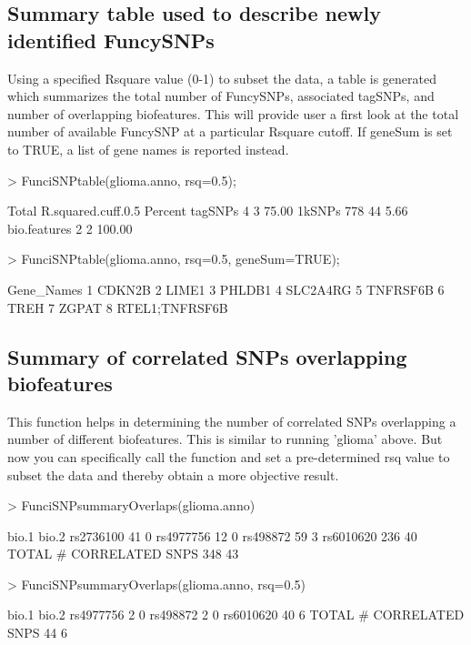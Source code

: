 \documentclass[a4paper]{article}
\begin{document}
\subsection*{Summary table used to describe newly identified FuncySNPs}
Using a specified Rsquare value (0-1) to subset the data, a table is generated 
which summarizes the total number of FuncySNPs, associated tagSNPs, and number
 of overlapping biofeatures. This will provide user a first look at the total 
 number of available FuncySNP at a particular Rsquare cutoff.  If geneSum is 
 set to TRUE, a list of gene names is reported instead.
\begin{Schunk}
\begin{Sinput}
> FunciSNPtable(glioma.anno, rsq=0.5);
\end{Sinput}
\begin{Soutput}
             Total R.squared.cuff.0.5 Percent
tagSNPs          4                  3   75.00
1kSNPs         778                 44    5.66
bio.features     2                  2  100.00
\end{Soutput}
\begin{Sinput}
> FunciSNPtable(glioma.anno, rsq=0.5, geneSum=TRUE);
\end{Sinput}
\begin{Soutput}
      Gene_Names
1         CDKN2B
2          LIME1
3         PHLDB1
4       SLC2A4RG
5       TNFRSF6B
6           TREH
7          ZGPAT
8 RTEL1;TNFRSF6B
\end{Soutput}
\end{Schunk}
\subsection*{Summary of correlated SNPs overlapping biofeatures}
This function helps in determining the number of correlated SNPs overlapping 
a number of different biofeatures. This is similar to running 'glioma' above.
But now you can specifically call the function and set a pre-determined rsq 
value to subset the data and thereby obtain a more objective result.
\begin{Schunk}
\begin{Sinput}
> FunciSNPsummaryOverlaps(glioma.anno)
\end{Sinput}
\begin{Soutput}
                        bio.1 bio.2
rs2736100                  41     0
rs4977756                  12     0
rs498872                   59     3
rs6010620                 236    40
TOTAL # CORRELATED SNPS   348    43
\end{Soutput}
\begin{Sinput}
> FunciSNPsummaryOverlaps(glioma.anno, rsq=0.5)
\end{Sinput}
\begin{Soutput}
                        bio.1 bio.2
rs4977756                   2     0
rs498872                    2     0
rs6010620                  40     6
TOTAL # CORRELATED SNPS    44     6
\end{Soutput}
\end{Schunk}
\end{document}
